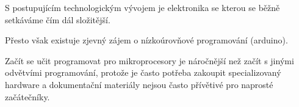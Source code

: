 S postupujícím technologickým vývojem je elektronika se kterou se běžně setkáváme čím dál složitější.

Přesto však existuje zjevný zájem o nízkoúrovňové programování (arduino).

Začít se učit programovat pro mikroprocesory je náročnější než začít s jinými odvětvími programování, protože je často potřeba zakoupit specializovaný hardware a dokumentační materiály nejsou často přívětivé pro naprosté začátečníky.